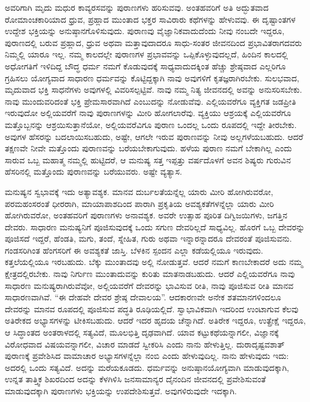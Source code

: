 ಅವರಿಗಾಗಿ ಮೃದು ಮಧುರ ಕಾವ್ಯರಸವನ್ನು ಪುರಾಣಗಳು ಹರಿಸುವವು. ಅಂತಹವರಿಗೆ ಅತಿ ಅದ್ಭುತವಾದ ರೋಮಾಂಚಕಾರಿಯಾದ ಧ್ರುವ, ಪ್ರಹ್ಲಾದ ಮುಂತಾದ ಭಕ್ತರ ಸಾವಿರಾರು ಕಥೆಗಳನ್ನು ಹೇಳುವವು. ಈ ದೃಷ್ಟಾಂತಗಳ ಉದ್ದೇಶ ಭಕ್ತಿಯನ್ನು ಅನುಷ್ಠಾನಗೊಳಿಸುವುದು. ಪುರಾಣವು ವೈಜ್ಞಾನಿಕವಾದುದೆಂದು ನೀವು ನಂಬದೇ ಇದ್ದರೂ, ಪುರಾಣದಲ್ಲಿ ಬರುವ ಪ್ರಹ್ಲಾದ, ಧ್ರುವ ಅಥವಾ ಮತ್ತಾವುದಾದರೂ ಸಾಧು-ಸಂತರ ಜೀವನದಿಂದ ಪ್ರಭಾವಿತರಾಗದವರು ನಿಮ್ಮಲ್ಲಿ ಯಾರೂ ಇಲ್ಲ. ನಮ್ಮ ಕಾಲದಲ್ಲೇ ಪುರಾಣಗಳ ಪ್ರಭಾವವನ್ನು ಒಪ್ಪಿಕೊಳ್ಳುವುದಲ್ಲದೆ, ಹಿಂದಿನ ಕಾಲದಲ್ಲಿ ಅಧೋಗತಿಗೆ ಇಳಿದಿದ್ದ ಬೌದ್ಧ ಧರ್ಮ ನಮಗೆ ಕೊಡುವುದಕ್ಕೆ ಸಾಧ್ಯವಾದುದಕ್ಕಿಂತ ಹೆಚ್ಚು ಶ್ರೇಷ್ಠವಾದ ಎಲ್ಲರಿಗೂ ಗ್ರಹಿಸಲು ಯೋಗ್ಯವಾದ ಸಾಧಾರಣ ಧರ್ಮವನ್ನು ಕೊಟ್ಟಿದ್ದಕ್ಕಾಗಿ ನಾವು ಅವುಗಳಿಗೆ ಕೃತಜ್ಞರಾಗಿರಬೇಕು. ಸುಲಭವಾದ, ಮೃದುವಾದ ಭಕ್ತಿ ಸಾಧನೆಗಳು ಅವುಗಳಲ್ಲಿ ವಿವರಿಸಲ್ಪಟ್ಟಿವೆ. ನಾವು ನಮ್ಮ ನಿತ್ಯ ಜೀವನದಲ್ಲಿ ಅವನ್ನು ಅನುಸರಿಸಬೇಕು. ನಾವು ಮುಂದುವರಿದಂತೆ ಭಕ್ತಿ ಪ್ರೇಮಸಾರವಾಗಿದೆ ಎಂಬುದನ್ನು ನೋಡುವೆವು. ಎಲ್ಲಿಯವರೆಗೂ ವ್ಯಕ್ತಿಗತ ಜಡಪ್ರೀತಿ ಇರುವುದೋ ಅಲ್ಲಿಯವರೆಗೆ ನಾವು ಪುರಾಣಗಳನ್ನು ಮೀರಿ ಹೋಗಲಾರೆವು. ವ್ಯಕ್ತಿಯು ಆಶ್ರಯಕ್ಕೆ ಎಲ್ಲಿಯವರೆಗೂ ಮತ್ತೊಬ್ಬನನ್ನು ಆಶ್ರಯಿಸುತ್ತಾನೆಯೋ, ಅಲ್ಲಿಯವರೆವಿಗೂ ಪುರಾಣ ಒಂದಲ್ಲ ಒಂದು ರೂಪದಲ್ಲಿ ಇದ್ದೇ ತೀರಬೇಕು. ಅವುಗಳ ಹೆಸರನ್ನು ಬದಲಾಯಿಸಬಹುದು, ಅಷ್ಟೇ, ಆಗಲೇ ಇರುವ ಪುರಾಣವನ್ನು ನೀವು ಅಲ್ಲಗಳೆಯಬಹುದು. ಆದರೆ ತಕ್ಷಣವೇ ನೀವೇ ಮತ್ತೊಂದು ಪುರಾಣವನ್ನು ಬರೆಯಬೇಕಾಗುವುದು. ಹಳೆಯ ಪುರಾಣ ನಮಗೆ ಬೇಕಾಗಿಲ್ಲ ಎಂದು ಸಾರುವ ಒಬ್ಬ ಮಹಾತ್ಮ ನಮ್ಮಲ್ಲಿ ಹುಟ್ಟಿದರೆ, ಆ ಮನುಷ್ಯ ಸತ್ತ ಇಪ್ಪತ್ತು ವರ್ಷದೊಳಗೆ ಅವನ ಶಿಷ್ಯರು ಗುರುವಿನ ಹೆಸರಿನಲ್ಲಿ ಮತ್ತೊಂದು ಪುರಾಣವನ್ನು ಬರೆಯುವರು. ಅಷ್ಟೇ ವ್ಯತ್ಯಾಸ.

ಮನುಷ್ಯನ ಸ್ವಭಾವಕ್ಕೆ ಇದು ಅತ್ಯಾವಶ್ಯಕ. ಮಾನವ ದುರ್ಬಲತೆಯನ್ನೆಲ್ಲ ಯಾರು ಮೀರಿ ಹೋಗಿರುವರೋ, ಪರಮಹಂಸರಂತೆ ಧೀರರಾಗಿ, ಮಾಯಾಪಾಶದಿಂದ ಪಾರಾಗಿ ಪ್ರಕೃತಿಯ ಅವಶ್ಯಕತೆಗಳನ್ನೆಲ್ಲಾ ಯಾರು ಮೀರಿ ಹೋಗಿರುವರೋ, ಅಂತಹವರಿಗೆ ಪುರಾಣಗಳು ಅನಾವಶ್ಯಕ. ಅವರೇ ಉತ್ಸಾಹ ಪೂರಿತ ದಿಗ್ವಿಜಯಿಗಳು, ಜಗತ್ತಿನ ದೇವರು. ಸಾಧಾರಣ ಮನುಷ್ಯನಿಗೆ ಪೂಜಿಸುವುದಕ್ಕೆ ಒಂದು ಸಗುಣ ದೇವರಿಲ್ಲದೆ ಸಾಧ್ಯವಿಲ್ಲ. ಹೊರಗೆ ಒಬ್ಬ ದೇವರನ್ನು ಪೂಜಿಸದೆ ಇದ್ದರೆ, ಹೆಂಡತಿ, ಮಗು, ತಂದೆ, ಸ್ನೇಹಿತ, ಗುರು ಅಥವಾ ಇನ್ನಾರನ್ನಾದರೂ ದೇವರಂತೆ ಪೂಜಿಸುವನು. ಗಂಡಸರಿಗಿಂತ ಹೆಂಗಸರಿಗೆ ಈ ಅವಶ್ಯಕತೆ ಜಾಸ್ತಿ. ಬೆಳಕಿನ ಸ್ಪಂದನ ಎಲ್ಲಾ ಕಡೆಯಲ್ಲಿಯೂ ಇರುವುದು. ಕತ್ತಲೆಯಲ್ಲಿಯೂ ಇರಬಹುದು. ಬೆಕ್ಕು ಮುಂತಾದವು ಅಲ್ಲಿ ನೋಡುತ್ತವೆ. ಆದರೆ ನಮಗೆ ಕಾಣಬೇಕಾದರೆ ಅದು ನಮ್ಮ ಕ್ಷೇತ್ರದಲ್ಲಿರಬೇಕು. ನಾವು ನಿರ್ಗುಣ ಮುಂತಾದುವನ್ನು ಕುರಿತು ಮಾತನಾಡಬಹುದು. ಆದರೆ ಎಲ್ಲಿಯವರೆಗೂ ನಾವು ಸಾಧಾರಣ ಮನುಷ್ಯರಾಗಿರುವೆವೋ, ಅಲ್ಲಿಯವರೆಗೆ ದೇವರನ್ನು ಭಾವಿಸುವ ರೀತಿ, ನಾವು ಪೂಜಿಸುವ ರೀತಿ ಮಾನವ ಸಾಧಾರಣವಾಗಿವೆ. “ಈ ದೇಹವೇ ದೇವರ ಶ್ರೇಷ್ಠ ದೇವಾಲಯ”. ಆದಕಾರಣವೇ ಅನೇಕ ಶತಮಾನಗಳಿಂದಲೂ ದೇವರನ್ನು ಮಾನವ ರೂಪದಲ್ಲಿ ಪೂಜಿಸುವ ಪದ್ಧತಿ ರೂಢಿಯಲ್ಲಿದೆ. ಸ್ವಾಭಾವಿಕವಾಗಿ ಇದರಿಂದ ಉಂಟಾಗುವ ಕೆಲವು ಅತಿರೇಕದ ಅಭ್ಯಾಸಗಳನ್ನು ಟೀಕಿಸಬಹುದು. ಆದರೆ ಇದರ ಹೃದಯ ಚೆನ್ನಾಗಿದೆ. ಅತಿರೇಕ ಇದ್ದರೂ, ಉತ್ಪ್ರೇಕ್ಷೆ ಇದ್ದರೂ, ಆ ಸಿದ್ಧಾಂತದ ಅಂತರಾಳದಲ್ಲಿ ಸತ್ಯವಿದೆ, ಮೂಲಭಿತ್ತಿ ದೃಢವಾಗಿದೆ. ಯಾವ ಕಟ್ಟುಕಥೆಯನ್ನಾಗಲೀ, ವಿಜ್ಞಾನಕ್ಕೆ ವಿರೋಧವಾದ ವಿಷಯವನ್ನಾಗಲೀ, ವಿಚಾರ ಮಾಡದೆ ಸ್ವೀಕರಿಸಿ ಎಂದು ನಾನು ಹೇಳುತ್ತಿಲ್ಲ. ದುರಾದೃಷ್ಟವಶಾತ್​ ಪುರಾಣಕ್ಕೆ ಪ್ರವೇಶಿಸಿದ ವಾಮಾಚಾರ ಅಭ್ಯಾಸಗಳನ್ನೆಲ್ಲಾ ನಂಬಿ ಎಂದು ಹೇಳುವುದಿಲ್ಲ. ನಾನು ಹೇಳುವುದು ಇದು: ಅದರಲ್ಲಿ ಒಂದು ಸತ್ಯವಿದೆ. ಅದನ್ನು ಮರೆಯಕೂಡದು. ಧರ್ಮವನ್ನು ಅನುಷ್ಠಾನಯೋಗ್ಯವಾಗಿ ಮಾಡುವುದಕ್ಕಾಗಿ, ಉನ್ನತ ತಾತ್ತ್ವಿಕ ಶಿಖರದಿಂದ ಅದನ್ನು ಕೆಳಗಿಳಿಸಿ ಜನಸಾಮಾನ್ಯರ ದೈನಂದಿನ ಜೀವನದಲ್ಲಿ ಪ್ರವೇಶಿಸುವಂತೆ ಮಾಡುವುದಕ್ಕಾಗಿ ಪುರಾಣಗಳು ಭಕ್ತಿಯನ್ನು ಉಪದೇಶಿಸುತ್ತವೆ. ಅವುಗಳಿರುವುದೇ ಇದಕ್ಕಾಗಿ.

